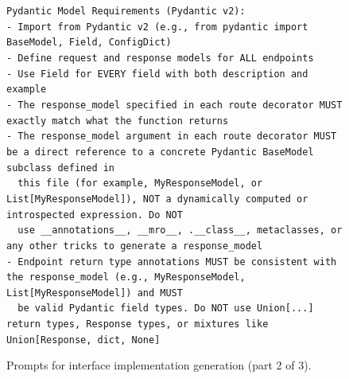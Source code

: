 \begin{figure}[p]
{\begin{minipage}{0.97\textwidth}
        \texttt{Pydantic Model Requirements (Pydantic v2):}\\
        \texttt{- Import from Pydantic v2 (e.g., from pydantic import BaseModel, Field, ConfigDict)}\\
        \texttt{- Define request and response models for ALL endpoints}\\
        \texttt{- Use Field for EVERY field with both description and example}\\
        \texttt{- The response\_model specified in each route decorator MUST exactly match what the function returns}\\
        \texttt{- The response\_model argument in each route decorator MUST be a direct reference to a concrete Pydantic BaseModel subclass defined in}\\
        \texttt{~~this file (for example, MyResponseModel, or List[MyResponseModel]), NOT a dynamically computed or introspected expression. Do NOT}\\
        \texttt{~~use \_\_annotations\_\_, \_\_mro\_\_, .\_\_class\_\_, metaclasses, or any other tricks to generate a response\_model}\\
        \texttt{- Endpoint return type annotations MUST be consistent with the response\_model (e.g., MyResponseModel, List[MyResponseModel]) and MUST}\\
        \texttt{~~be valid Pydantic field types. Do NOT use Union[...] return types, Response types, or mixtures like Union[Response, dict, None]}

        \vspace{1pt}
        \end{minipage}
    }
    \captionsetup{labelformat=default, name=Figure}
    \caption{Prompts for interface implementation generation (part 2 of 3).}
    \label{fig:gen-env-2}
\end{figure}
